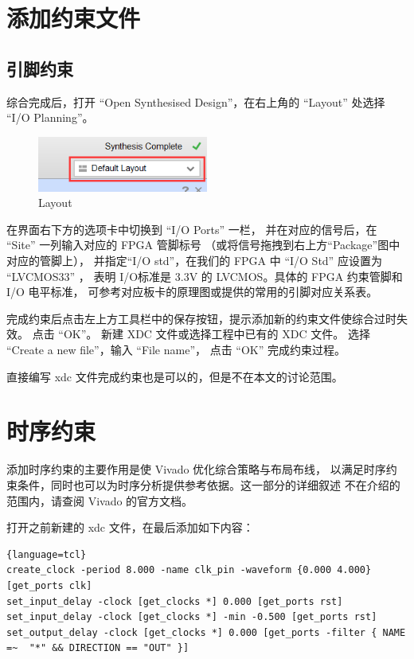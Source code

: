 \documentclass[ichigo,normal,cn]{elegantnote_mod}
\begin{document}
\section{添加约束文件}

\subsection{引脚约束}
综合完成后，打开 “Open Synthesised Design”，在右上角的 “Layout” 处选择
“I/O Planning”。

\begin{figure}[!htbp]
    \centering
    \includegraphics[width=0.5\textwidth]{fig/Con1}
    \caption{Layout}
    \label{fig:Con1}
\end{figure}

在界面右下方的选项卡中切换到 “I/O Ports” 一栏，
并在对应的信号后，在 “Site” 一列输入对应的 FPGA 管脚标号
（或将信号拖拽到右上方“Package”图中对应的管脚上），
并指定“I/O std”，在我们的 FPGA 中 “I/O Std” 应设置为 “LVCMOS33” ，
表明 I/O标准是 3.3V 的 LVCMOS。具体的 FPGA 约束管脚和 I/O 电平标准，
可参考对应板卡的原理图或提供的常用的引脚对应关系表。

完成约束后点击左上方工具栏中的保存按钮，提示添加新的约束文件使综合过时失效。
点击 “OK”。 新建 XDC 文件或选择工程中已有的 XDC 文件。
选择 “Create a new file”，输入 “File name”，
点击 “OK” 完成约束过程。 

直接编写 xdc 文件完成约束也是可以的，但是不在本文的讨论范围。

\section{时序约束}

添加时序约束的主要作用是使 Vivado 优化综合策略与布局布线，
以满足时序约束条件，同时也可以为时序分析提供参考依据。这一部分的详细叙述
不在介绍的范围内，请查阅 Vivado 的官方文档。

打开之前新建的 xdc 文件，在最后添加如下内容：

\begin{lstlisting}{language=tcl}
create_clock -period 8.000 -name clk_pin -waveform {0.000 4.000} [get_ports clk]
set_input_delay -clock [get_clocks *] 0.000 [get_ports rst]
set_input_delay -clock [get_clocks *] -min -0.500 [get_ports rst]
set_output_delay -clock [get_clocks *] 0.000 [get_ports -filter { NAME =~  "*" && DIRECTION == "OUT" }] 
\end{lstlisting}
\end{document}
